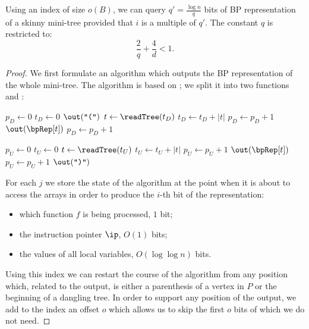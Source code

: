 \begin{lemma}\label{l:usr-bp-skinny}
	Using an index of size $o(B)$, we can query $q' = \frac{\log n}{q}$ bits of BP representation of a skinny mini-tree provided that $i$ is a multiple of $q'$.
	The constant $q$ is restricted to:
	$$\frac{2}{q} + \frac{4}{d} < 1.$$
\end{lemma}
\begin{proof}
	We first formulate an algorithm which outputs the BP representation of the whole mini-tree.
	The algorithm is based on \restore{}; we split it into two functions \bpSkinnyDown{} and \bpSkinnyUp{}:
	
	\begin{algorithm}
	\begin{algorithmic}
	\Function{\bpSkinnyDown}{}
		\State $p_D \gets 0$%
		\Instr $t_D \gets 0$
			\State $\out(\openingParen)$
				\State $t \gets \readTree(t_D)$%
				\Instr $t_D \gets t_D + |t|$%
				\Instr $p_D \gets p_D + 1$
				\State $\out(\bpRep[t])$
			\EndWhile
			\State $p_D \gets p_D + 1$ 
		\EndWhile
	\EndFunction

	\Function{\bpSkinnyUp}{}
		\State $p_U \gets 0$%
		\Instr $t_U \gets 0$
				\State $t \gets \readTree(t_U)$%
				\Instr $t_U \gets t_U + |t|$%
				\Instr $p_U \gets p_U + 1$
				\State $\out(\bpRep[t])$
			\EndWhile
			\State $p_U \gets p_U + 1$ 
			\State $\out(\closingParen)$
		\EndWhile
	\EndFunction
	\end{algorithmic}
	\end{algorithm}
	
	For each $j$ we store the state of the algorithm at the point when it is about to access the arrays in order to produce the $i$-th bit of the representation:
	\begin{itemize}
		\item which function $f$ is being processed, $1$ bit;
		\item the instruction pointer $\ip$, $O(1)$ bits;
		\item the values of all local variables, $O(\log \log n)$ bits.
	\end{itemize}
	
	Using this index we can restart the course of the algorithm from any position which, related to the output, is either a parenthesis of a vertex in $P$ or the beginning of a dangling tree.
	In order to support any position of the output, we add to the index an offset $o$ which allows us to skip the first $o$ bits of which we do not need.
	

\end{proof}

